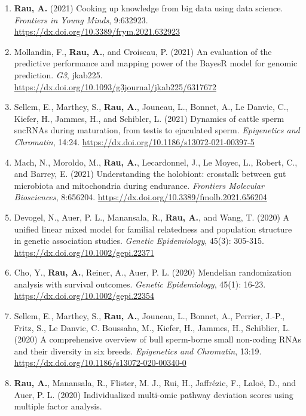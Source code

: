 \documentclass[11pt, a4paper]{awesome-cv}
\providecommand{\tightlist}{%
	\setlength{\itemsep}{0pt}\setlength{\parskip}{0pt}}
\begin{document}
\begin{enumerate}
\def\labelenumi{\arabic{enumi}.}
\tightlist
\item
  \textbf{Rau, A.} (2021) Cooking up knowledge from big data using data
  science. \emph{Frontiers in Young Minds}, 9:632923.
  \url{https://dx.doi.org/10.3389/frym.2021.632923}
\item
  Mollandin, F., \textbf{Rau, A.}, and Croiseau, P. (2021) An evaluation
  of the predictive performance and mapping power of the BayesR model
  for genomic prediction. \emph{G3}, jkab225.
  \url{https://dx.doi.org/10.1093/g3journal/jkab225/6317672}
\item
  Sellem, E., Marthey, S., \textbf{Rau, A.}, Jouneau, L., Bonnet, A., Le
  Danvic, C., Kiefer, H., Jammes, H., and Schibler, L. (2021) Dynamics
  of cattle sperm sncRNAs during maturation, from testis to ejaculated
  sperm. \emph{Epigenetics and Chromatin}, 14:24.
  \url{https://dx.doi.org/10.1186/s13072-021-00397-5}
\item
  Mach, N., Moroldo, M., \textbf{Rau, A.}, Lecardonnel, J., Le Moyec,
  L., Robert, C., and Barrey, E. (2021) Understanding the holobiont:
  crosstalk between gut microbiota and mitochondria during endurance.
  \emph{Frontiers Molecular Biosciences}, 8:656204.
  \url{https://dx.doi.org/10.3389/fmolb.2021.656204}
\item
  Devogel, N., Auer, P. L., Manansala, R., \textbf{Rau, A.}, and Wang,
  T. (2020) A unified linear mixed model for familial relatedness and
  population structure in genetic association studies. \emph{Genetic
  Epidemiology}, 45(3): 305-315.
  \url{https://dx.doi.org/10.1002/gepi.22371}
\item
  Cho, Y., \textbf{Rau, A.}, Reiner, A., Auer, P. L. (2020) Mendelian
  randomization analysis with survival outcomes. \emph{Genetic
  Epidemiology}, 45(1): 16-23.
  \url{https://dx.doi.org/10.1002/gepi.22354}
\item
  Sellem, E., Marthey, S., \textbf{Rau, A.}, Jouneau, L., Bonnet, A.,
  Perrier, J.-P., Fritz, S., Le Danvic, C. Boussaha, M., Kiefer, H.,
  Jammes, H., Schiblier, L. (2020) A comprehensive overview of bull
  sperm-borne small non-coding RNAs and their diversity in six breeds.
  \emph{Epigenetics and Chromatin}, 13:19.
  \url{https://dx.doi.org/10.1186/s13072-020-00340-0}
\item
  \textbf{Rau, A.}, Manansala, R., Flister, M. J., Rui, H., Jaffrézic,
  F., Laloë, D., and Auer, P. L. (2020) Individualized multi-omic
  pathway deviation scores using multiple factor analysis.

\end{enumerate}
\end{document}
